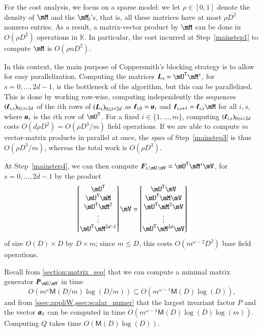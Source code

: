 \documentclass[final,1p,times,authoryear]{elsarticle}
\newcommand{\mat}[1]{\bm{\MakeUppercase{#1}}} %
\newcommand{\row}[1]{\bm{\MakeLowercase{#1}}} %
\newcommand{\seqelt}[1]{\bm{F}_{#1}} %
\newcommand{\sqfree}{Q}
\newcommand{\trsp}[1]{#1^{\mathsf{T}}} %
\newcommand{\density}{\rho}
\def\M {\ensuremath{\mathsf{M}}}
\def\K{\mathbb{K}}
\def\K {\ensuremath{\mathbb{K}}}
\newcommand{\mUt}{\trsp{\mU}}
\begin{document}
For the cost analysis, we focus on a sparse model: we let $\density
\in [0,1]$ denote the density of $\mM$ and the $\mM_i$'s, that is, all
these matrices have at most $\density D^2$ nonzero entries.  As a
result, a matrix-vector product by $\mM$ can be done in $O(\density
D^2)$ operations in $\K$. In particular, the cost incurred at
Step~\ref{mainstep1} to compute $\mM$ is $O(\density n D^2)$.

In this context, the main purpose of Coppersmith's blocking strategy
is to allow for easy parallelization. Computing the matrices
$\mat{L}_s=\mUt\mM^s$, for $s=0,\dots,2d-1$, is the bottleneck
of the algorithm, but this can be parallelized. This is done by
working row-wise, computing independently the sequences
$(\row{\ell}_{i,s})_{0 \le s < 2d}$ of the $i$th rows of
$(\mat{L}_s)_{0 \le s < 2d}$ as $\row{\ell}_{i,0}=\row{u}_i$ and
$\row{\ell}_{i,s+1} = \row{\ell}_{i,s}
\mM$ for all $i,s$, where $\row{u}_i$ is the $i$th row of $\mUt$.
For a fixed $i \in \{1,\dots,m\}$, computing $(\mat{\ell}_{i,s})_{0
\le i < 2d}$ costs $O(d \density D^2) = O(\density D^3/m )$ field operations. If
we are able to compute $m$ vector-matrix products in parallel at once,
the {\em span} of Step~\ref{mainstep3} is thus $O(\density D^3/m)$, whereas
the total work is $O(\density D^3)$.

At Step~\ref{mainstep4}, we can then compute $\seqelt{s,\mU,\mV}=\mUt\mM^s\mV$, for $s=0,\dots,2d-1$ by the
product
$$
\begin{bmatrix}
  \mUt\\
  \mUt \mM\\
  \mUt \mM^2\\
  \vdots\\
  \mUt \mM^{2d-1}\\
\end{bmatrix} \mV
= 
\begin{bmatrix}
  \mUt \mV\\
  \mUt \mM \mV\\
  \mUt \mM^2 \mV\\
  \vdots \\
  \mUt \mM^{2d} \mV\\
\end{bmatrix}
$$
of size $O(D) \times D$ by $D \times m$; since $m \le D$, this  costs $O(m^{\omega-2}D^2)$
base field operations.

Recall from \cref{section:matrix_seq} that we can compute a minimal
matrix generator $\mat{P}_{\mU,\mV}$ in time
\[
  O(m^{\omega} \M(D/m) \log(D/m)) \subseteq O(m^{\omega-1} \M(D) \log(D)),
\]
and from
\cref{ssec:appliW,ssec:scalar_numer} that the
largest invariant factor $P$ and the vector $\row{a}_1$ can be
computed in time $O(m^{\omega-1} \M(D) \log(D) \log(m))$.  Computing $\sqfree$
takes time $O(\M(D) \log(D))$.
\end{document}
